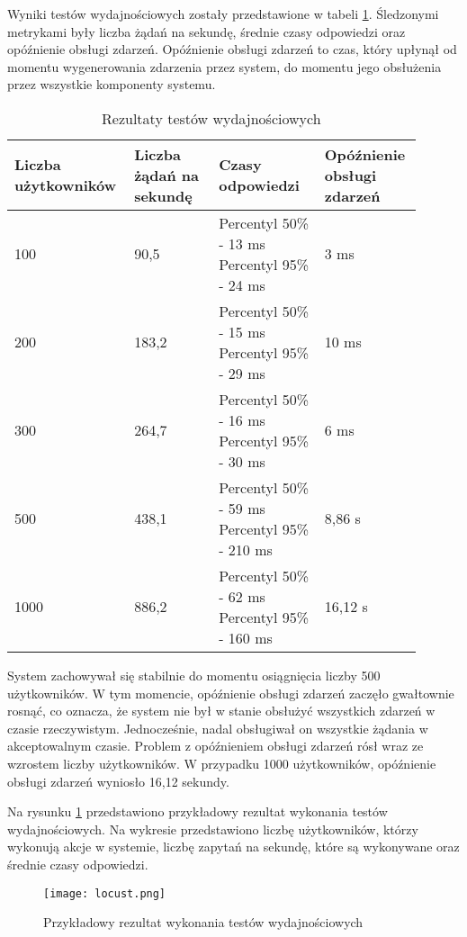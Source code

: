 Wyniki testów wydajnościowych zostały przedstawione w tabeli \ref{table:performance}. Śledzonymi metrykami były liczba żądań na sekundę, średnie czasy odpowiedzi oraz opóźnienie obsługi zdarzeń. Opóźnienie obsługi zdarzeń to czas, który upłynął od momentu wygenerowania zdarzenia przez system, do momentu jego obsłużenia przez wszystkie komponenty systemu.

\begin{longtable}{| m{0.25\linewidth} | m{0.2\linewidth} | m{0.25\linewidth} | m{0.2\linewidth} |}
    \caption{Rezultaty testów wydajnościowych}
    \label{table:performance} \\

    \hline
    Liczba użytkowników & Liczba żądań na sekundę & Czasy odpowiedzi & Opóźnienie obsługi zdarzeń \\ \hline\hline \endfirsthead \endfoot
    \hline \endlastfoot

    100 & 90,5 & Percentyl 50\% - 13 ms \newline Percentyl 95\% - 24 ms & 3 ms \\ \hline
    200 & 183,2 & Percentyl 50\% - 15 ms \newline Percentyl 95\% - 29 ms & 10 ms \\ \hline
    300 & 264,7 & Percentyl 50\% - 16 ms \newline Percentyl 95\% - 30 ms & 6 ms \\ \hline
    500 & 438,1 & Percentyl 50\% - 59 ms \newline Percentyl 95\% - 210 ms & 8,86 s \\ \hline
    1000 & 886,2 & Percentyl 50\% - 62 ms \newline Percentyl 95\% - 160 ms & 16,12 s \\ \hline
\end{longtable}

System zachowywał się stabilnie do momentu osiągnięcia liczby 500 użytkowników. W tym momencie, opóźnienie obsługi zdarzeń zaczęło gwałtownie rosnąć, co oznacza, że system nie był w stanie obsłużyć wszystkich zdarzeń w czasie rzeczywistym. Jednocześnie, nadal obsługiwał on wszystkie żądania w akceptowalnym czasie. Problem z opóźnieniem obsługi zdarzeń rósł wraz ze wzrostem liczby użytkowników. W przypadku 1000 użytkowników, opóźnienie obsługi zdarzeń wyniosło 16,12 sekundy.


Na rysunku \ref{fig:locust} przedstawiono przykładowy rezultat wykonania testów wydajnościowych. Na wykresie przedstawiono liczbę użytkowników, którzy wykonują akcje w systemie, liczbę zapytań na sekundę, które są wykonywane oraz średnie czasy odpowiedzi.

\begin{figure}[!h]
    \centering \texttt{[image: locust.png]}
    \caption{Przykładowy rezultat wykonania testów wydajnościowych}
    \label{fig:locust}
\end{figure}